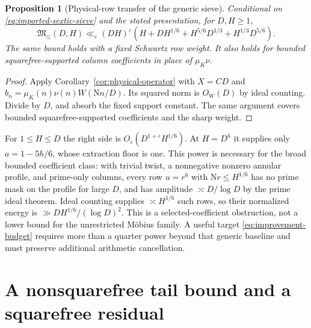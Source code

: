 \documentclass[11pt]{article}
\numberwithin{equation}{section}
\newtheorem{proposition}[theorem]{Proposition}
\theoremstyle{definition}
\theoremstyle{remark}
\newcommand{\N}{\mathrm N}
\newcommand{\muK}{\mu_K}
\newcommand{\Mfrak}{\mathfrak M}
\newcommand{\eps}{\varepsilon}
\begin{document}
\begin{proposition}[Physical-row transfer of the generic sieve]
\label{prop:physical-generic-sieve}
Conditional on \eqref{eq:imported-sextic-sieve} and the stated
presentation, for $D,H\ge1$,
\begin{equation}\label{eq:physical-generic-sieve}
 \Mfrak_{\le}(D,H)\ll_\eps(DH)^\eps
 \left(H+DH^{1/6}+H^{5/6}D^{1/3}+H^{1/3}D^{5/6}\right).
\end{equation}
The same bound holds with a fixed Schwartz row weight. It also holds
for bounded squarefree-supported column coefficients in place of
$\muK\nu$.
\end{proposition}

\begin{proof}
Apply Corollary~\ref{cor:physical-operator} with \(X=CD\) and
\(b_n=\muK(n)\nu(n)W(\N n/D)\). Its squared norm is \(O_W(D)\)
by ideal counting. Divide by \(D\), and absorb the fixed support
constant. The same argument covers bounded squarefree-supported
coefficients and the sharp weight.
\end{proof}

For $1\le H\le D$ the right side is $O_\eps(D^{1+\eps}H^{1/6})$.
At $H=D^h$ it supplies only $a=1-5h/6$, whose extraction floor is one.
This power is necessary for the broad bounded coefficient class:
with trivial twist, a nonnegative nonzero annular profile, and prime-only
columns, every row $u=r^6$ with $\N r\le H^{1/6}$ has no prime mask on
the profile for large $D$, and has amplitude $\asymp D/\log D$ by the
prime ideal theorem. Ideal counting supplies $\asymp H^{1/6}$ such rows,
so their normalized energy is $\gg DH^{1/6}/(\log D)^2$.
This is a selected-coefficient obstruction, not a lower bound for the
unrestricted M\"obius family. A useful target \eqref{eq:improvement-budget}
requires more than a quarter power beyond that generic baseline and
must preserve additional arithmetic cancellation.



\section{A nonsquarefree tail bound and a squarefree residual}
\label{sec:squarefree-tail}
\end{document}
